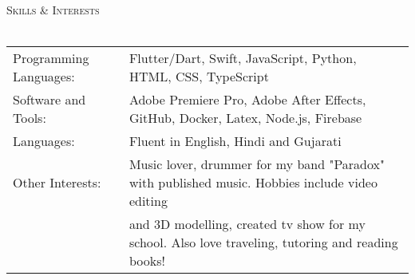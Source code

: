 \documentclass[a4paper]{article}
\newcommand{\lineunder} {
    \vspace*{-8pt} \\
    \hspace*{-10pt} \hrulefill \\
}
\newcommand{\header} [1] {
    {\hspace*{-10pt}\vspace*{6pt} \large\textsc{#1}}
    \vspace*{-6pt} \lineunder
}
\begin{document}
\vspace*{1mm}
\header{Skills \& Interests}
\begin{tabular}{ l l }
	Programming Languages: & Flutter/Dart, Swift, JavaScript, Python, HTML, CSS, TypeScript     \\
	Software and Tools:    & Adobe Premiere Pro, Adobe After Effects, GitHub, Docker, Latex, Node.js, Firebase \\
    Languages:    & Fluent in English, Hindi and Gujarati \\
    Other Interests:    & Music lover, drummer for my band "Paradox" with published music. Hobbies include video editing \\
                        & and 3D modelling, created tv show for my school. Also love traveling, tutoring and reading books! \\
\end{tabular}

\vspace*{-80pt}
\end{document}
